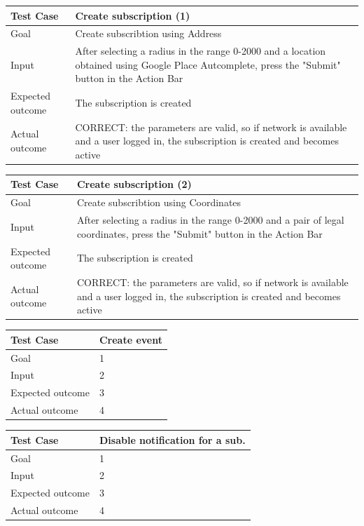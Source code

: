 \documentclass[a4paper]{scrreprt}
\begin{document}
\bigskip
\noindent
\begin{tabularx}{\linewidth}{|l|X|}
	\hline
	\textbf{Test Case} 	& \textbf{Create subscription (1)} \\ \hline
	Goal 				& Create subscribtion using Address\\ \hline
	Input 				& After selecting a radius in the range 0-2000 and a location obtained using Google Place Autcomplete, press the "Submit" button in the Action Bar \\ \hline
	Expected outcome 	& The subscription is created \\ \hline
	Actual outcome 		& CORRECT: the parameters are valid, so if network is available and a user logged in, the subscription is created and becomes active \\ \hline
\end{tabularx}
\bigskip
\noindent
\begin{tabularx}{\linewidth}{|l|X|}
	\hline
	\textbf{Test Case} 	& \textbf{Create subscription (2)} \\ \hline
	Goal 				& Create subscribtion using Coordinates\\ \hline
	Input 				& After selecting a radius in the range 0-2000 and a pair of legal coordinates, press the "Submit" button in the Action Bar \\ \hline
	Expected outcome 	& The subscription is created \\ \hline
	Actual outcome 		& CORRECT: the parameters are valid, so if network is available and a user logged in, the subscription is created and becomes active \\ \hline
\end{tabularx}
\bigskip
\noindent
\begin{tabularx}{\linewidth}{|l|X|}
	\hline
	\textbf{Test Case} 	& \textbf{Create event} \\ \hline
	Goal 				& 1 \\ \hline
	Input 				& 2 \\ \hline
	Expected outcome 	& 3 \\ \hline
	Actual outcome 		& 4 \\ \hline
\end{tabularx}
\bigskip
\noindent
\begin{tabularx}{\linewidth}{|l|X|}
	\hline
	\textbf{Test Case} 	& \textbf{Disable notification for a sub.} \\ \hline
	Goal 				& 1 \\ \hline
	Input 				& 2 \\ \hline
	Expected outcome 	& 3 \\ \hline
	Actual outcome 		& 4 \\ \hline
\end{tabularx}
\end{document}
